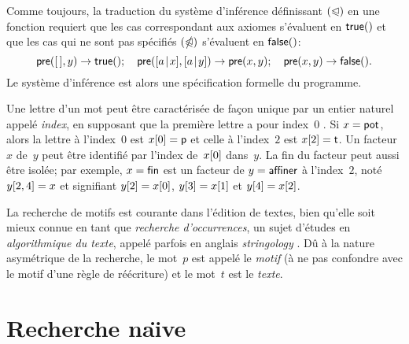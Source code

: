 
Comme toujours, la traduction du système d'inférence définissant
\((\mathord{\trianglelefteqslant})\) en une fonction 
requiert que les cas correspondant aux axiomes s'évaluent en
\(\textsf{true}()\) et que les cas qui ne sont pas spécifiés
\((\mathord{\ntrianglelefteqslant})\) s'évaluent en \(\textsf{false}()\):
\begin{equation*}
\textsf{pre}([\,],y) \rightarrow \textsf{true}();\quad
\textsf{pre}([{a}\!\mid\!{x}],[{a}\!\mid\!{y}]) \rightarrow \textsf{pre}(x,y);\quad
\textsf{pre}(x,y) \rightarrow \textsf{false}().
\end{equation*}
Le système d'inférence est alors une spécification formelle du
programme.

Une lettre d'un mot peut être caractérisée de façon unique par un
entier naturel appelé \emph{index},
en supposant que la première lettre a pour index~\(0\)
\citep{Dijkstra_1982}. Si \(x=\textsf{pot}\), alors la lettre à
l'index~\(0\) est \({x}[{0}]=\textsf{p}\) et celle à l'index~\(2\) est
\({x}[{2}]=\textsf{t}\). Un facteur~\(x\) de~\(y\) peut être identifié
par l'index de~\({x}[{0}]\) dans~\(y\). La fin du facteur peut aussi
être isolée; par exemple, \(x=\textsf{fin}\) est un facteur de
\(y=\textsf{affiner}\) à l'index~\(2\), noté \({y}[{2,4}] = x\) et
signifiant \({y}[{2}] = {x}[{0}]\), \({y}[{3}] = {x}[{1}]\) et
\({y}[{4}] = {x}[{2}]\).

La recherche de motifs est courante dans l'édition de textes, bien
qu'elle soit mieux connue en tant que \emph{recherche d'occurrences},
un sujet d'études en \emph{algorithmique du texte}, appelé parfois en
anglais \emph{stringology}
\citep{CharrasLecroq_2004,CrochemoreHancartLecroq_2007}
\citep[\S{}32]{CLRS_2009}. Dû à la nature asymétrique de la recherche,
le mot~\(p\) est appelé le \emph{motif} (à ne pas confondre avec le motif d'une règle de
réécriture) et le mot~\(t\) est le \emph{texte}.

\section{Recherche na\"{\i}ve}
\label{sec_naive_factoring}


